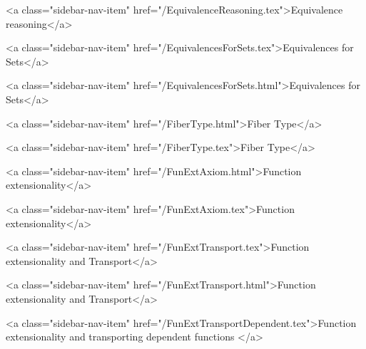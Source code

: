       
    
      
        
          <a class="sidebar-nav-item" href="/EquivalenceReasoning.tex">Equivalence reasoning</a>
        
      
    
      
        
          <a class="sidebar-nav-item" href="/EquivalencesForSets.tex">Equivalences for Sets</a>
        
      
    
      
        
          <a class="sidebar-nav-item" href="/EquivalencesForSets.html">Equivalences for Sets</a>
        
      
    
      
        
          <a class="sidebar-nav-item" href="/FiberType.html">Fiber Type</a>
        
      
    
      
        
          <a class="sidebar-nav-item" href="/FiberType.tex">Fiber Type</a>
        
      
    
      
        
          <a class="sidebar-nav-item" href="/FunExtAxiom.html">Function extensionality</a>
        
      
    
      
        
          <a class="sidebar-nav-item" href="/FunExtAxiom.tex">Function extensionality</a>
        
      
    
      
        
          <a class="sidebar-nav-item" href="/FunExtTransport.tex">Function extensionality and Transport</a>
        
      
    
      
        
          <a class="sidebar-nav-item" href="/FunExtTransport.html">Function extensionality and Transport</a>
        
      
    
      
        
          <a class="sidebar-nav-item" href="/FunExtTransportDependent.tex">Function extensionality and transporting dependent functions </a>
        
      
    
